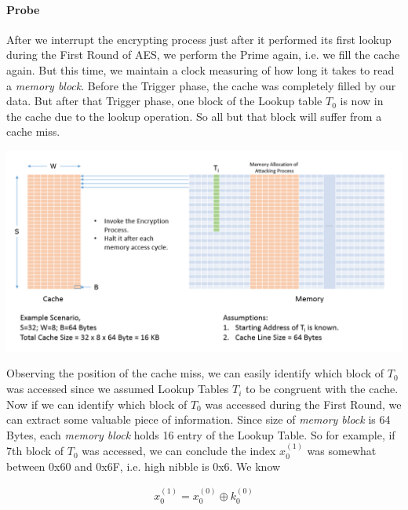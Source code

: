 \paragraph{Probe}
After we interrupt the encrypting process just after it performed its first lookup during the First Round of AES, we perform the Prime again, i.e. we fill the cache again. But this time, we maintain a clock measuring of how long it takes to read a \emph{memory block}. Before the Trigger phase, the cache was completely filled by our data. But after that Trigger phase, one block of the 
Lookup table $T_0$ is now in the cache due to the lookup operation. So all but that block will suffer from a cache miss.

\begin{center}
\includegraphics[scale=0.4,natwidth=1159,natheight=589]{Figures/prime(new).png}
\label{fig: Demonstration of the Prime phase.}
\end{center}

Observing the position of the cache miss, we can easily identify which block of $T_0$ was accessed since we assumed Lookup Tables $T_i$ to be congruent with the cache. Now if we can identify which block of $T_0$ was accessed during the First Round, we can extract some valuable piece of information. Since size of \emph{memory block} is 64 Bytes, each \emph{memory block} holds 16 entry of the Lookup Table. So for example, if 7th block of $T_0$ was accessed, we can conclude the index $x_0^{(1)}$ was somewhat between 0x60 and 0x6F, i.e. high nibble is 0x6. We know

\begin{align*}
x_0^{(1)}=x_0^{(0)} \oplus k_0^{(0)}
\end{align*}

